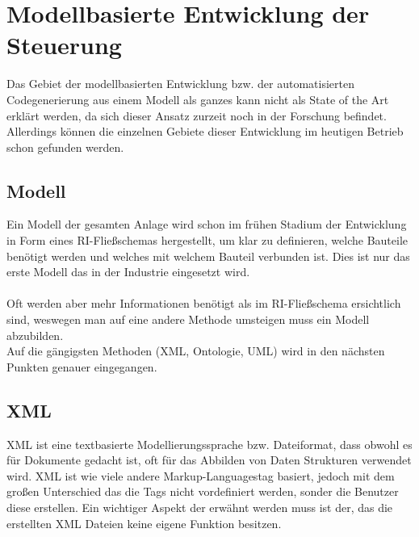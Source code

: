 \newpage

\section{Modellbasierte Entwicklung der Steuerung} \label{modellbasierte_entwicklung}
Das Gebiet der modellbasierten Entwicklung bzw. der automatisierten Codegenerierung aus einem Modell als ganzes kann nicht als State of the Art erklärt werden, da sich dieser Ansatz zurzeit noch in der Forschung befindet.\\
Allerdings können die einzelnen Gebiete dieser Entwicklung im heutigen Betrieb schon gefunden werden.
\subsection{Modell}
Ein Modell der gesamten Anlage wird schon im frühen Stadium der Entwicklung in Form eines RI-Fließschemas hergestellt, um klar zu definieren, welche Bauteile benötigt werden und welches mit welchem Bauteil verbunden ist. Dies ist nur das erste Modell das in der Industrie eingesetzt wird.\\
\\
Oft werden aber mehr Informationen benötigt als im RI-Fließschema ersichtlich sind, weswegen man auf eine andere Methode umsteigen muss ein Modell abzubilden.\\
Auf die gängigsten Methoden (XML, Ontologie, UML) wird in den nächsten Punkten genauer eingegangen.
\subsection{XML}
XML ist eine textbasierte Modellierungssprache bzw. Dateiformat, dass obwohl es für Dokumente gedacht ist, oft für das Abbilden von Daten Strukturen verwendet wird. XML ist wie viele andere \glqq Markup-Languages\grqq\space tag basiert, jedoch mit dem großen Unterschied das die Tags nicht vordefiniert werden, sonder die Benutzer diese erstellen. Ein wichtiger Aspekt der erwähnt werden muss ist der, das die erstellten XML Dateien keine eigene Funktion besitzen.\\

